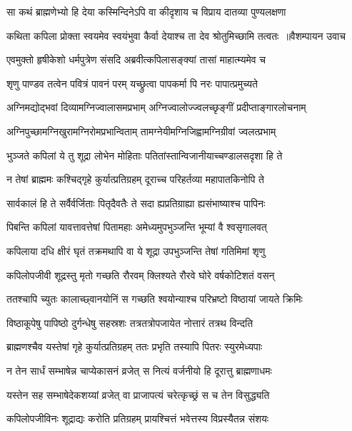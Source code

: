 \twolineshloka
{सा कथं ब्राह्मणेभ्यो हि देया कस्मिन्दिनेऽपि वा}
{कीदृशाय च विप्राय दातव्या पुण्यलक्षणा}


\threelineshloka
{कथिता कपिला प्रोक्ता स्वयमेव स्वयंभुवा}
{कैर्वा देयाश्च ता देव श्रोतुमिच्छामि तत्वतः ॥वैशम्पायन उवाच}
{}


\twolineshloka
{एवमुक्तो हृषीकेशो धर्मपुत्रेण संसदि}
{अब्रवीत्कपिलासङ्क्यां तासां माहात्म्यमेव च}


\twolineshloka
{शृणु पाण्डव तत्वेन पवित्रं पावनं परम्}
{यच्छ्रुत्वा पापकर्मा पि नरः पापात्प्रमुच्यते}


\twolineshloka
{अग्निमद्योद्भवां दिव्यामग्निज्वालासमप्रभाम्}
{अग्निज्वालोज्ज्वलच्छृङ्गीं प्रदीप्ताङ्गारलोचनाम्}


\twolineshloka
{अग्निपुच्छामग्निखुरामग्निरोमप्रभान्विताम्}
{तामग्नेयीमग्निजिह्वामग्निग्रीवां ज्वलत्प्रभाम्}


\twolineshloka
{भुञ्जते कपिलां ये तु शूद्रा लोभेन मोहिताः}
{पतितांस्तान्विजानीयाच्चण्डालसदृशा हि ते}


\twolineshloka
{न तेषां ब्राह्ममः कश्चिद्गृहे कुर्यात्प्रतिग्रहम्}
{दूराच्च परिहर्तव्या महापातकिनोपि ते}


\twolineshloka
{सार्वकालं हि ते सर्वैर्वर्जिताः पितृदैवतैः}
{ते सदा ह्यप्रतिग्राह्या ह्यसंभाष्याश्च पापिनः}


\twolineshloka
{पिबन्ति कपिलां यावत्तावत्तेषां पितामहाः}
{अमेध्यमुपभुञ्जन्ति भूम्यां वै श्वसृगालवत्}


\twolineshloka
{कपिलाया दधि क्षीरं घृतं तक्रमथापि वा}
{ये शूद्रा उपभुञ्जन्ति तेषां गतिमिमां शृणु}


\twolineshloka
{कपिलोपजीवी शूद्रस्तु मृतो गच्छति रौरवम्}
{क्लिश्यते रौरवे घोरे वर्षकोटिशतं वसन्}


\twolineshloka
{ततश्चापि च्युतः कालाच्छ्वानयोनिं स गच्छति}
{श्वयोन्याश्च परिभ्रष्टो विष्ठायां जायते क्रिमिः}


\twolineshloka
{विष्ठाकूपेषु पापिष्ठो दुर्गन्धेषु सहस्रशः}
{तत्रतत्रोपजायेत नोत्तारं तत्रथ विन्दति}


\twolineshloka
{ब्राह्मणश्चैव यस्तेषां गृहे कुर्यात्प्रतिग्रहम्}
{ततः प्रभृति तस्यापि पितरः स्युरमेध्यपाः}


\twolineshloka
{न तेन सार्धं सम्भाषेन्न चाप्येकासनं व्रजेत्}
{स नित्यं वर्जनीयो हि दूरात्तु ब्राह्मणाधमः}


\twolineshloka
{यस्तेन सह सम्भाषेदेकशय्यां व्रजेत् वा}
{प्राजापत्यं चरेत्कृच्छ्रं स च तेन विसुद्ध्यति}


\twolineshloka
{कपिलोपजीविनः शूद्राद्यः करोति प्रतिग्रहम्}
{प्रायश्चित्तं भवेत्तस्य विप्रस्यैतन्न संशयः}


